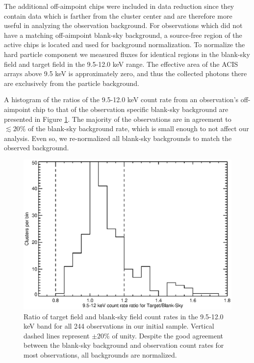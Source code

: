 \documentclass[12pt,preprint]{aastex}
\begin{document}
The additional off-aimpoint chips were included in data reduction
since they contain data which is farther from the cluster center and
are therefore more useful in analyzing the observation background. For
observations which did not have a matching off-aimpoint blank-sky
background, a source-free region of the active chips is
located and used for background normalization. To normalize the hard
particle component we measured fluxes for identical regions in the
blank-sky field and target field in the 9.5-12.0 keV range. The
effective area of the ACIS arrays above 9.5 keV is approximately zero,
and thus the collected photons there are exclusively from the particle
background.

A histogram of the ratios of the 9.5-12.0 keV count rate from an
observation's off-aimpoint chip to that of the observation specific
blank-sky background are presented in Figure \ref{fig:bgd}. The
majority of the observations are in agreement to $\lesssim 20\%$ of
the blank-sky background rate, which is small enough to not affect our
analysis. Even so, we re-normalized all blank-sky backgrounds to match
the observed background.

\clearpage
\begin{figure}
\begin{center}
\includegraphics*[width=\textwidth, trim=5mm 0mm 0mm 0mm, clip]{f2.eps}
\caption{
Ratio of target field and blank-sky field count rates in the 9.5-12.0
keV band for all 244 observations in our initial sample. Vertical
dashed lines represent $\pm 20\%$ of unity. Despite the good agreement
between the blank-sky background and observation count rates for most
observations, all backgrounds are normalized.
}
\label{fig:bgd}
\end{center}
\end{figure}
\clearpage
\end{document}

